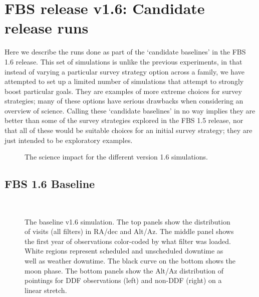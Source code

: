 \section{FBS release v1.6: Candidate release runs}\label{sec:1.6}

Here we describe the runs done as part of the `candidate baselines' in the FBS 1.6 release.  This set of simulations is unlike the previous experiments, in that instead of varying a particular survey strategy option across a family, we have attempted to set up a limited number of simulations that attempt to strongly boost particular goals. They are examples of more extreme choices for survey strategies; many of these options have serious drawbacks when considering an overview of science. Calling these `candidate baselines' in no way implies they are better than some of the survey strategies explored in the FBS 1.5 release, nor that all of these would be suitable choices for an initial survey strategy; they are just intended to be exploratory examples. 

\begin{figure}
\caption{The science impact for the different version 1.6 simulations.}\label{fig:v16radar}
\end{figure}

\subsection{FBS 1.6 Baseline}\label{ss:1.6baseline}

\begin{figure}
 \\
\caption{The baseline v1.6 simulation. The top panels show the distribution of visits (all filters) in RA/dec and Alt/Az. The middle panel shows the first year of observations color-coded by what filter was loaded. White regions represent scheduled and unscheduled downtime as well as weather downtime. The black curve on the bottom shows the moon phase. The bottom panels show the Alt/Az distribution of pointings for DDF observations (left) and non-DDF (right) on a linear stretch.}\label{fig:baseline1.6}
\end{figure}


